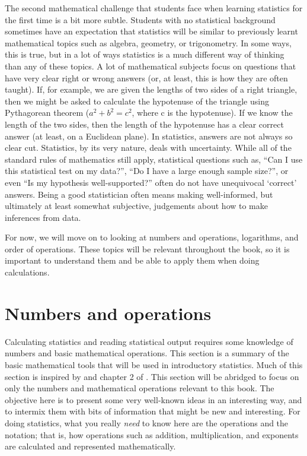\documentclass[
]{scrbook}
\begin{document}
The second mathematical challenge that students face when learning statistics for the first time is a bit more subtle.
Students with no statistical background sometimes have an expectation that statistics will be similar to previously learnt mathematical topics such as algebra, geometry, or trigonometry.
In some ways, this is true, but in a lot of ways statistics is a much different way of thinking than any of these topics.
A lot of mathematical subjects focus on questions that have very clear right or wrong answers (or, at least, this is how they are often taught).
If, for example, we are given the lengths of two sides of a right triangle, then we might be asked to calculate the hypotenuse of the triangle using Pythagorean theorem (\(a^{2} + b^{2} = c^{2}\), where c is the hypotenuse).
If we know the length of the two sides, then the length of the hypotenuse has a clear correct answer (at least, on a Euclidean plane).
In statistics, answers are not always so clear cut.
Statistics, by its very nature, deals with uncertainty.
While all of the standard rules of mathematics still apply, statistical questions such as, ``Can I use this statistical test on my data?'', ``Do I have a large enough sample size?'', or even ``Is my hypothesis well-supported?'' often do not have unequivocal `correct' answers.
Being a good statistician often means making well-informed, but ultimately at least somewhat subjective, judgements about how to make inferences from data.

For now, we will move on to looking at numbers and operations, logarithms, and order of operations.
These topics will be relevant throughout the book, so it is important to understand them and be able to apply them when doing calculations.

\hypertarget{numbers-and-operations}{%
\section{Numbers and operations}\label{numbers-and-operations}}

Calculating statistics and reading statistical output requires some knowledge of numbers and basic mathematical operations.
This section is a summary of the basic mathematical tools that will be used in introductory statistics.
Much of this section is inspired by \citet{Courant1996} and chapter 2 of \citet{Pastor2008}.
This section will be abridged to focus on only the numbers and mathematical operations relevant to this book.
The objective here is to present some very well-known ideas in an interesting way, and to intermix them with bits of information that might be new and interesting.
For doing statistics, what you really \emph{need} to know here are the operations and the notation; that is, how operations such as addition, multiplication, and exponents are calculated and represented mathematically.
\end{document}
